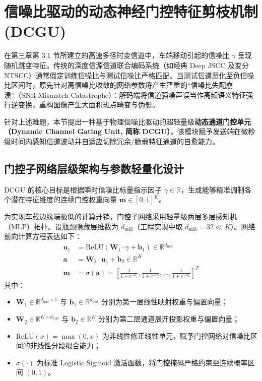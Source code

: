 \section{信噪比驱动的动态神经门控特征剪枝机制 (DCGU)}
\label{sec:3_2_dcgu_gating}

在第三章第 3.1 节所建立的高速多径时变信道中，车端移动引起的信噪比 $\gamma$ 呈现随机跳变特征。传统的深度信源信道联合编码系统（如经典 Deep JSCC 及变分 NTSCC）通常假定训练信噪比与测试信噪比严格匹配。当测试信道恶化至负信噪比区间时，原先针对高信噪比收敛的网络参数将产生严重的“信噪比失配崩溃”（SNR Mismatch Catastrophe）：解码端将信道强噪声误当作高频语义特征强行逆变换，重构图像产生大面积斑点畸变与伪影。

针对上述难题，本节提出一种基于物理信噪比驱动的超轻量级\textbf{动态通道门控单元（Dynamic Channel Gating Unit, 简称 DCGU）}。该模块赋予发送端在微秒级时间内感知信道波动并自适应切除冗余/脆弱特征通道的自愈能力。

\subsection{门控子网络层级架构与参数轻量化设计}
DCGU 的核心目标是根据瞬时信噪比标量指示因子 $\gamma \in \mathbb{R}$，生成能够精准调制各个潜在特征维度的连续门控权重向量 $\bm{m} \in [0, 1]^K$。

为实现车载边缘端极低的计算开销，门控子网络采用轻量级两层多层感知机（MLP）拓扑。设瓶颈隐藏层维数为 $d_{\text{mid}}$（工程实现中取 $d_{\text{mid}} = 32 \ll K$）。网络前向计算方程表达如下：
\begin{align}
  \bm{u}_1 &= \text{ReLU}(\bm{W}_1 \cdot \gamma + \bm{b}_1) \in \mathbb{R}^{d_{\text{mid}}} \label{eq:dcgu_layer1} \\
  \bm{a}   &= \bm{W}_2 \cdot \bm{u}_1 + \bm{b}_2 \in \mathbb{R}^K \label{eq:dcgu_layer2} \\
  \bm{m}   &= \sigma(\bm{a}) = \left[ \frac{1}{1 + e^{-a_1}}, \frac{1}{1 + e^{-a_2}}, \dots, \frac{1}{1 + e^{-a_K}} \right]^T \label{eq:dcgu_sigmoid}
\end{align}
其中：
\begin{itemize}
  \item $\bm{W}_1 \in \mathbb{R}^{d_{\text{mid}} \times 1}$ 与 $\bm{b}_1 \in \mathbb{R}^{d_{\text{mid}}}$ 分别为第一层线性映射权重与偏置向量；
  \item $\bm{W}_2 \in \mathbb{R}^{K \times d_{\text{mid}}}$ 与 $\bm{b}_2 \in \mathbb{R}^K$ 分别为第二层通道展开投影权重与偏置向量；
  \item $\text{ReLU}(x) = \max(0, x)$ 为非线性修正线性单元，赋予门控网络对信噪比区间的非线性分段拟合能力；
  \item $\sigma(\cdot)$ 为标准 Logistic Sigmoid 激活函数，将门控掩码严格约束至连续概率区间 $(0, 1)$。
\end{itemize}

